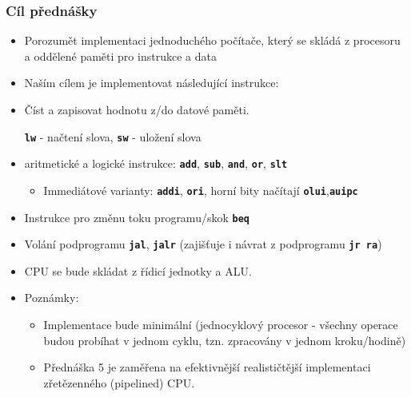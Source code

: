 \documentclass{beamer}
\begin{document}
\begin{frame}
\frametitle{Cíl přednášky}

\begin{itemize}
\item Porozumět implementaci jednoduchého počítače, který se skládá z
procesoru a oddělené paměti pro instrukce a data
\item Naším cílem je implementovat následující instrukce:
\item Číst a zapisovat hodnotu z/do datové paměti.
\begin{itemize}
\textbf{\texttt{lw}} - načtení slova, \textbf{\texttt{sw}} - uložení slova
\end{itemize}
\item aritmetické a logické instrukce: \textbf{\texttt{add}}, \textbf{\texttt{sub}}, \textbf{\texttt{and}}, \textbf{\texttt{or}}, \textbf{\texttt{slt}}
\begin{itemize}
\item Immediátové varianty: \textbf{\texttt{addi}}, \textbf{\texttt{ori}}, horní bity načítají \textbf{\texttt{olui}},\textbf{\texttt{auipc}}
\end{itemize}
\item Instrukce pro změnu toku programu/skok \textbf{\texttt{beq}}
\item Volání podprogramu \textbf{\texttt{jal}}, \textbf{\texttt{jalr}} (zajišťuje i návrat z podprogramu \textbf{\texttt{jr~ra}})
\item CPU se bude skládat z řídicí jednotky a ALU.
\item Poznámky:
\begin{itemize}
\item Implementace bude minimální (jednocyklový procesor - všechny operace budou probíhat v jednom cyklu, tzn.
zpracovány v jednom kroku/hodině)
\item Přednáška 5 je zaměřena na efektivnější realističtější implementaci zřetězenného (pipelined) CPU.
\end{itemize}
\end{itemize}

\end{frame}
\end{document}
